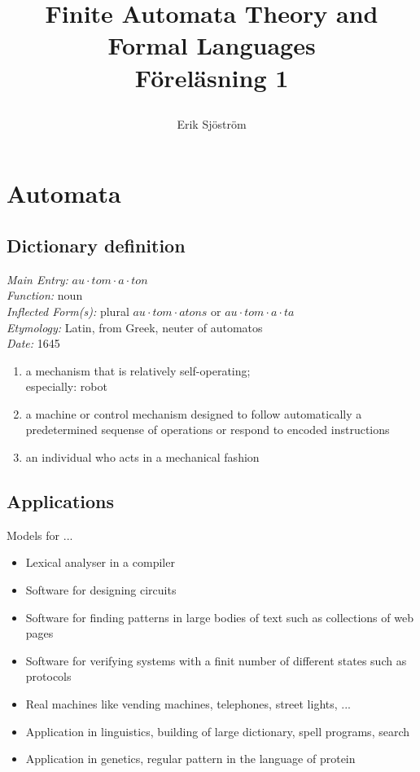 
\usepackage{color}
\usepackage{bnf}
\title{
	 Finite Automata Theory and Formal Languages\\
	 Föreläsning 1
    \author{Erik Sjöström}
}

\maketitle

\section{Automata}
\label{sec:Automata}

\subsection{Dictionary definition}
\label{sub:Dictionary definition}
\emph{Main Entry:} $au \cdot tom \cdot a \cdot ton$\\
\emph{Function:} noun\\
\emph{Inflected Form(s):} plural $au \cdot tom \cdot atons$ or $au \cdot tom \cdot a \cdot ta$\\
\emph{Etymology:} Latin, from Greek, neuter of automatos\\
\emph{Date:} 1645
\begin{enumerate}
    \item a mechanism that is relatively self-operating;\\especially: robot
    \item a machine or control mechanism designed to follow automatically
    a predetermined sequense of operations or respond to encoded instructions
    \item an individual who acts in a mechanical fashion
\end{enumerate}

\subsection{Applications}
\label{sub:Applications}
Models for ...
\begin{itemize}
    \item Lexical analyser in a compiler
	\item Software for designing circuits
	\item Software for finding patterns in large bodies of text such as
	collections of web pages
	\item Software for verifying systems with a finit number of different
	states such as protocols
	\item Real machines like vending machines, telephones, street lights, ...
	\item Application in linguistics, building of large dictionary,
	spell programs, search
	\item Application in genetics, regular pattern in the language of protein
\end{itemize}

